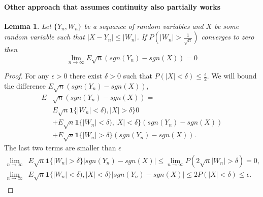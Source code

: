 \documentclass{article}
\newtheorem{lemma}{Lemma}
\begin{document}
\paragraph{Other approach that assumes continuity also partially works}
\begin{lemma}
 Let $\{Y_n,W_n\}$ be a sequance of random variables and $X$ be some random variable such that $|X-Y_n| \leq |W_n|$. If $P(|W_n| > \frac {1}{\sqrt n} )$ converges to zero   then
 \[
  \lim_{n \to \infty } E \sqrt n (sgn(Y_n) - sgn(X)) = 0
 \]
\end{lemma} 
\begin{proof}
For any $\epsilon> 0$ there exist $\delta>0$ such that $P(|X| < \delta  ) \leq \frac \epsilon 2$. We will bound the difference $E \sqrt n (sgn(Y_n) - sgn(X))$,
\begin{align}
E & \sqrt n (sgn(Y_n) - sgn(X))= \\
& E \sqrt n \mathbf  1 \{ |W_n| < \delta ) , |X| > \delta \} 0 \\
&+ E \sqrt n \mathbf 1 \{ |W_n| < \delta)  , |X| < \delta\}  (sgn(Y_n) - sgn(X)) \\
&+ E \sqrt n \mathbf 1 \{ |W_n| > \delta  \}  (sgn(Y_n) - sgn(X)).  
 \end{align}
The last two terms are smaller than $\epsilon$
 \begin{align}
\lim_{n \to \infty}&   E\sqrt n \mathbf 1 \{ |W_n| > \delta   \}  |sgn(Y_n) - sgn(X)| \leq \lim_{n \to \infty} P(2 \sqrt n |W_n|>\delta) =0, \\
\lim_{n \to \infty}&   E \sqrt n \mathbf 1 \{ |W_n| < \delta )  , |X| < \delta  \}  |sgn(Y_n) - sgn(X)| \leq 2 P(|X| < \delta) \leq \epsilon. \\
\end{align}
\end{proof}
\end{document}
